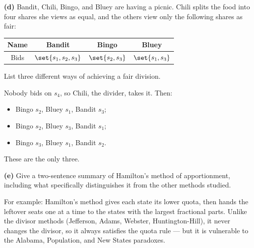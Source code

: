 \documentclass[12pt]{ximera}
\begin{document}
\begin{problem}
\begin{prompt}
\textbf{(d)} Bandit, Chili, Bingo, and Bluey are having a picnic. Chili splits the food
into four shares she views as equal, and the others view only the following shares as
fair:
\begin{center}
\begin{tabular}{c|ccc}
Name & Bandit & Bingo & Bluey\\\hline
Bids & $\set{s_1,s_2,s_3}$ & $\set{s_2,s_3}$ & $\set{s_1,s_3}$
\end{tabular}
\end{center}
List three different ways of achieving a fair division.

\begin{freeResponse}
\end{freeResponse}

\begin{feedback}
Nobody bids on $s_4$, so Chili, the divider, takes it. Then:
\begin{itemize}
\item Bingo $s_2$, Bluey $s_1$, Bandit $s_3$;
\item Bingo $s_2$, Bluey $s_3$, Bandit $s_1$;
\item Bingo $s_3$, Bluey $s_1$, Bandit $s_2$.
\end{itemize}
These are the only three.
\end{feedback}
\end{prompt}

\begin{prompt}
\textbf{(e)} Give a two-sentence summary of Hamilton's method of apportionment,
including what specifically distinguishes it from the other methods studied.

\begin{freeResponse}
\end{freeResponse}

\begin{feedback}
For example: Hamilton's method gives each state its lower quota, then hands the
leftover seats one at a time to the states with the largest fractional parts. Unlike
the divisor methods (Jefferson, Adams, Webster, Huntington-Hill), it never changes the
divisor, so it always satisfies the quota rule --- but it is vulnerable to the Alabama,
Population, and New States paradoxes.
\end{feedback}
\end{prompt}
\end{problem}
\end{document}
